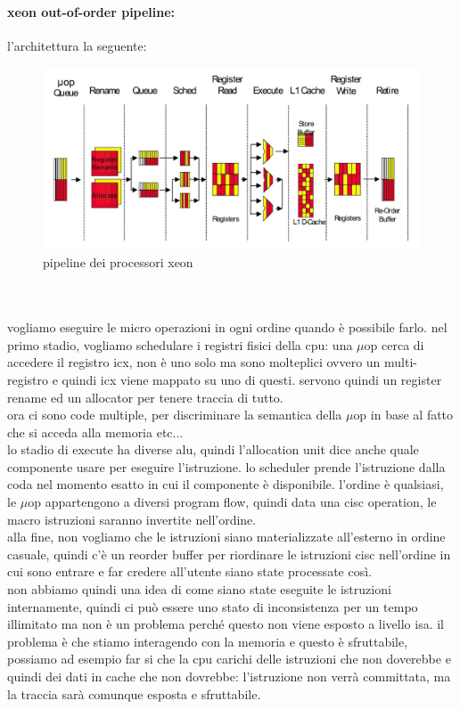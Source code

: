 \documentclass[12pt, oneside]{extbook} %
\begin{document}
\paragraph{xeon out-of-order pipeline:}
l'architettura  la seguente:\\
\begin{figure}[!h]
	\includegraphics[scale=0.5]{immagini/xeon_ooo.png}
	\caption{pipeline dei processori xeon}
\end{figure}\\\\
vogliamo eseguire le micro operazioni in ogni ordine quando è possibile farlo. nel primo stadio, vogliamo schedulare i registri fisici della cpu: una $\mu$op cerca di accedere il registro icx, non è uno solo ma sono molteplici ovvero un multi-registro e quindi icx viene mappato su uno di questi. servono quindi un register rename ed un allocator per tenere traccia di tutto.\\ ora ci sono code multiple, per discriminare la semantica della $\mu$op in base al fatto che si acceda alla memoria etc...\\ lo stadio di execute ha diverse alu, quindi l'allocation unit dice anche quale componente usare per eseguire l'istruzione. lo scheduler prende l'istruzione dalla coda nel momento esatto in cui il componente è disponibile. l'ordine è qualsiasi, le $\mu$op appartengono a diversi program flow, quindi data una cisc operation, le macro istruzioni saranno invertite nell'ordine. \\ alla fine, non vogliamo che le istruzioni siano materializzate all'esterno in ordine casuale, quindi c'è un reorder buffer per riordinare le istruzioni cisc nell'ordine in cui sono entrare e far credere all'utente siano state processate così.\\ non abbiamo quindi una idea di come siano state eseguite le istruzioni internamente, quindi ci può essere uno stato di inconsistenza per un tempo illimitato ma non è un problema perché questo non viene esposto a livello isa. il problema è che stiamo interagendo con la memoria e questo è sfruttabile, possiamo ad esempio far si che la cpu carichi delle istruzioni che non doverebbe e quindi dei dati in cache che non dovrebbe: l'istruzione non verrà committata, ma la traccia sarà comunque esposta e sfruttabile.
\end{document}
